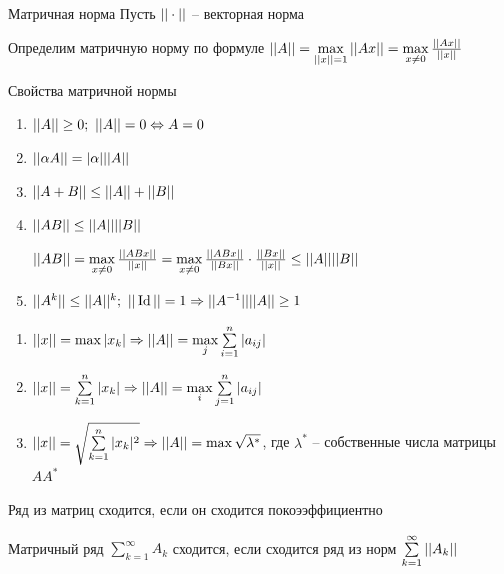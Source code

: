 \documentclass[12pt]{article}
\begin{document}
\begin{defin}{Матричная норма}
    Пусть $|| \cdot ||$ -- векторная норма
    
    Определим матричную норму по формуле $|| A || = \max\limits_{|| x || = 1} || Ax || = \max\limits_{x \neq 0} \frac{|| Ax ||}{|| x ||}$
\end{defin}

\begin{theo}{Свойства матричной нормы}
    \begin{enumerate}
        \item $|| A || \geq 0;\ || A || = 0 \Leftrightarrow A = 0$
        \item $|| \alpha A || = |\alpha| || A ||$
        \item $|| A + B || \leq || A || + || B ||$
        \item $|| AB || \leq || A |||| B ||$
        
        $|| AB || = \max\limits_{x \neq 0} \frac{|| ABx ||}{|| x ||} = \max\limits_{x \neq 0} \frac{|| ABx ||}{|| Bx ||} \cdot \frac{|| Bx ||}{|| x ||} \leq || A || || B ||$

        \item[4'.] $\parl{A^k} \leq \parl{A}^k;\ \parl{\Id} = 1 \Rightarrow \parl{A^{-1}}\parl{A} \geq 1$
    \end{enumerate}
\end{theo}

\begin{Example}{}
    \begin{enumerate}
        \item $|| x || = \max|x_k| \Rightarrow || A || = \max\limits_j \sum\limits_{i = 1}^n |a_{ij}|$ 
        \item $|| x || = \sum\limits_{k = 1}^n |x_k| \Rightarrow || A || = \max\limits_i \sum\limits_{j = 1}^n |a_{ij}|$
        \item $|| x || = \sqrt{\sum\limits_{k = 1}^n |x_k|^2} \Rightarrow || A || = \max \sqrt{\lambda^*}$, где $\lambda^*$ -- собственные числа матрицы $AA^*$
    \end{enumerate}
\end{Example}

\begin{nota}{}
    Ряд из матриц сходится, если он сходится покоээффициентно
\end{nota}

\begin{propos}{}
    Матричный ряд $\sum\limits_{k = 1}^\infty A_k$ сходится, если сходится ряд из норм $\sum\limits_{k = 1}^\infty || A_k ||$
\end{propos}
\end{document}

